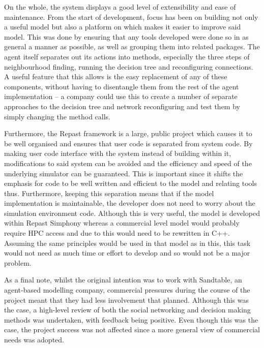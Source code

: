 \documentclass[]{report}
\begin{document}
On the whole, the system displays a good level of extensibility and ease of maintenance. From the start of development, focus has been on building not only a useful model but also a platform on which makes it easier to improve said model. This was done by ensuring that any tools developed were done so in as general a manner as possible, as well as grouping them into related packages. The agent itself separates out its actions into methods, especially the three steps of neighbourhood finding, running the decision tree and reconfiguring connections. A useful feature that this allows is the easy replacement of any of these components, without having to disentangle them from the rest of the agent implementation – a company could use this to create a number of separate approaches to the decision tree and network reconfiguring and test them by simply changing the method calls.

Furthermore, the Repast framework is a large, public project which causes it to be well organised and ensures that user code is separated from system code. By making user code interface with the system instead of building within it, modifications to said system can be avoided and the efficiency and speed of the underlying simulator can be guaranteed. This is important since it shifts the emphasis for code to be well written and efficient to the model and relating tools thus. Furthermore, keeping this separation means that if the model implementation is maintainable, the developer does not need to worry about the simulation environment code. Although this is very useful, the model is developed within Repast Simphony whereas a commercial level model would probably require HPC access and due to this would need to be rewritten in C++. Assuming the same principles would be used in that model as in this, this task would not need as much time or effort to develop and so would not be a major problem.

As a final note, whilst the original intention was to work with Sandtable, an agent-based modelling company, commercial pressures during the course of the project meant that they had less involvement that planned. Although this was the case, a high-level review of both the social networking and decision making methods was undertaken, with feedback being positive. Even though this was the case, the project success was not affected since a more general view of commercial needs was adopted.
\end{document}
